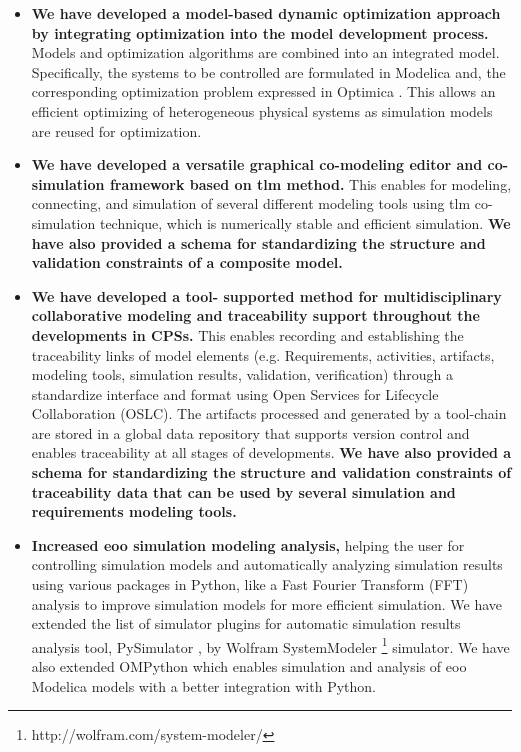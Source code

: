 \begin{itemize}
	
\item \textbf{We have developed a model-based dynamic optimization approach 
by integrating optimization into the model development process.}
Models and optimization algorithms are combined into an integrated 
model. Specifically, the systems to be controlled are formulated 
in Modelica and, the corresponding optimization problem expressed 
in Optimica \cite{optimica}. This allows an efficient optimizing of 
heterogeneous physical systems as simulation models are reused for optimization.

\item \textbf{We have developed a versatile graphical co-modeling editor and co-simulation framework based on \acrshort{tlm} method.} This enables for modeling, connecting, and simulation of several different modeling tools using \acrshort{tlm} co-simulation technique, which is numerically stable and efficient simulation. \textbf{We have also provided a schema for standardizing the structure and validation constraints of a composite model.} 

\item \textbf{We have developed a tool- supported method for multidisciplinary collaborative modeling and traceability support throughout the developments in CPSs.} This enables recording and establishing the traceability links of model elements (e.g. Requirements, activities, artifacts, modeling tools, simulation results, validation, verification) through a standardize interface and format using Open Services for Lifecycle Collaboration (OSLC). The artifacts processed and generated by a tool-chain are stored in a global data repository that supports version control and enables traceability at all stages of developments.\textbf{ We have also provided a schema for standardizing the structure and validation constraints of traceability data that can be used by several simulation and requirements modeling tools.} 

\item \textbf{Increased \acrshort{eoo} simulation modeling analysis,} helping the user for controlling simulation models and automatically analyzing simulation results using various packages in Python, like a Fast Fourier Transform (FFT) analysis to improve simulation models for more efficient simulation. We have extended the list of simulator plugins for automatic simulation results analysis tool, PySimulator \cite{pysimulator}, by Wolfram SystemModeler \footnote{http://wolfram.com/system-modeler/} simulator. We have also extended OMPython \cite{ompython} which enables simulation and analysis of \acrshort{eoo} Modelica models with a better integration with Python.

\end{itemize}


